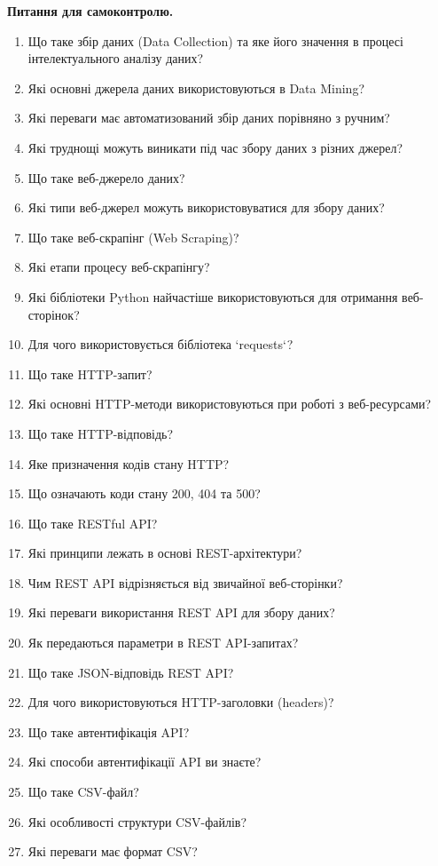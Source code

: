 \medskip
{} \textbf{Питання для самоконтролю.}

\begin{enumerate}
\item Що таке збір даних (Data Collection) та яке його значення в процесі інтелектуального аналізу даних?
\item Які основні джерела даних використовуються в Data Mining?
\item Які переваги має автоматизований збір даних порівняно з ручним?
\item Які труднощі можуть виникати під час збору даних з різних джерел?
\item Що таке веб-джерело даних?
\item Які типи веб-джерел можуть використовуватися для збору даних?
\item Що таке веб-скрапінг (Web Scraping)?
\item Які етапи процесу веб-скрапінгу?
\item Які бібліотеки Python найчастіше використовуються для отримання веб-сторінок?
\item Для чого використовується бібліотека `requests`?
\item Що таке HTTP-запит?
\item Які основні HTTP-методи використовуються при роботі з веб-ресурсами?
\item Що таке HTTP-відповідь?
\item Яке призначення кодів стану HTTP?
\item Що означають коди стану 200, 404 та 500?
\item Що таке RESTful API?
\item Які принципи лежать в основі REST-архітектури?
\item Чим REST API відрізняється від звичайної веб-сторінки?
\item Які переваги використання REST API для збору даних?
\item Як передаються параметри в REST API-запитах?
\item Що таке JSON-відповідь REST API?
\item Для чого використовуються HTTP-заголовки (headers)?
\item Що таке автентифікація API?
\item Які способи автентифікації API ви знаєте?
\item Що таке CSV-файл?
\item Які особливості структури CSV-файлів?
\item Які переваги має формат CSV?

\end{enumerate}
